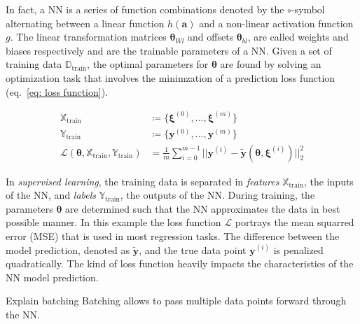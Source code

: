 In fact, a NN is a series of function combinations denoted by the $\circ$-symbol alternating between a linear function $h(\bm{a})$
and a non-linear activation function $g$. The linear transformation matrices $\bm{\theta}_{Wl}$ and offsets $\bm{\theta}_{bl}$,
are called weights and biases respectively and are the trainable parameters of a NN. Given a set of training data $\mathbb{D}_\text{train}$,
the optimal parameters for $\bm{\theta}$ are found by solving an optimization task that involves the minimzation of a prediction loss function (eq.~\ref{eq: loss function}).

\begin{equation}
    \label{eq: loss function}
    \begin{aligned}
        \mathbb{X}_\text{train} &\coloneq \{ \bm{\xi}^{(0)}, \hdots, \bm{\xi}^{(m)} \}
        \\
        \mathbb{Y}_\text{train} &\coloneq \{ \bm{y}^{(0)}, \hdots, \bm{y}^{(m)} \} 
        \\
        \mathcal{L}(\bm{\theta}, \mathbb{X}_\text{train}, \mathbb{Y}_\text{train}) &=
        \frac{1}{m} \sum_{i=0}^{m-1} \Big| \Big| \bm{y}^{(i)} - \bm{\tilde{y}}(\bm{\theta}, \bm{\xi}^{(i)}) \Big | \Big|_2^2
    \end{aligned}
\end{equation}

In \emph{supervised learning}, the training data is separated in \emph{features} $\mathbb{X}_\text{train}$, the inputs of the NN,
and \emph{labels} $\mathbb{Y}_\text{train}$, the outputs of the NN. During training, the parameters $\bm{\theta}$ are determined such that
the NN approximates the data in best possible manner.
In this example the loss function $\mathcal{L}$ portrays the mean squarred error (MSE) that is used in most regression tasks. 
The difference between the model prediction, denoted as $\bm{\tilde{y}}$, and the true data point $\bm{y}^{(i)}$ is penalized quadratically.
The kind of loss function heavily impacts the characteristics of the NN model prediction.

Explain batching
Batching allows to pass multiple data points forward
through the NN.

